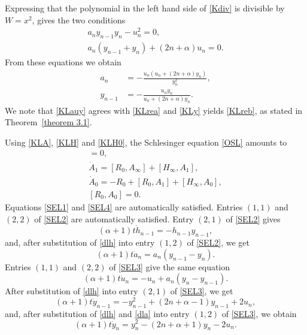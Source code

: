 \documentclass[10pt, reqno]{amsart}
\numberwithin{equation}{section}
\numberwithin{equation}{section}
\begin{document}
Expressing that the polynomial in the left hand side of \eqref{Kdiv} is divisible by $W=x^2$, gives the two conditions
\begin{gather}
a_ny_{n-1}y_n-u_n^2=0,\label{dxklt}\\
a_n(y_{n-1}+y_n)+(2n+\alpha)u_n=0.\label{dx2klt}
\end{gather}
From these equations we obtain
\begin{align}
a_n&=-\frac{u_n(u_n+(2n+\alpha)y_n)}{y_n^2},\label{KLauy}\\
y_{n-1}&=-\frac{u_ny_n}{u_n+(2n+\alpha)y_n}.\label{KLym1}
\end{align}
We note that \eqref{KLauy} agrees with \eqref{KLrea} and \eqref{KLy} yields \eqref{KLreb}, as stated in Theorem~\ref{theorem 3.1}.

Using \eqref{KLA}, \eqref{KLH} and \eqref{KLH0}, the Schlesinger equation \eqref{OSL} amounts to
\begin{gather}
[H_\infty,A_\infty]=0,\label{SEL1}\\
\dot{A}_1=[R_0,A_\infty]+[H_\infty,A_1],\label{SEL2}\\
\dot{A}_0=-R_0+[R_0,A_1]+[H_\infty,A_0]\label{SEL3},\\
[R_0,A_0]=0\label{SEL4}.
\end{gather}
Equations \eqref{SEL1} and \eqref{SEL4} are automatically satisfied. Entries $(1,1)$ and $(2,2)$ of \eqref{SEL2} are automatically satisfied. Entry $(2,1)$ of \eqref{SEL2} gives
\begin{equation}\label{dlh}
(\alpha+1)t\dot{h}_{n-1}=-h_{n-1}y_{n-1},
\end{equation}
and, after substitution of \eqref{dlh} into entry $(1,2)$ of \eqref{SEL2}, we get
\begin{equation}\label{dla}
(\alpha+1)t\dot{a}_n=a_n(y_{n-1}-y_n).
\end{equation}
Entries $(1,1)$ and $(2,2)$ of \eqref{SEL3} give the same equation
\begin{equation} \label{dlu1}
(\alpha+1)t\dot{u}_n=-u_n+a_n(y_n-y_{n-1}).
\end{equation}
After substitution of \eqref{dlh} into entry $(2,1)$ of \eqref{SEL3}, we get
\begin{equation*} 
(\alpha+1)t\dot{y}_{n-1}=-y_{n-1}^2+(2n+\alpha-1)y_{n-1}+2u_n,
\end{equation*}
and, after substitution of \eqref{dlh} and \eqref{dla} into entry $(1,2)$ of \eqref{SEL3}, we obtain
\begin{equation} \label{dly2}
(\alpha+1)t\dot{y}_n=y_n^2-(2n+\alpha+1)y_n-2u_n.
\end{equation}
\end{document}

